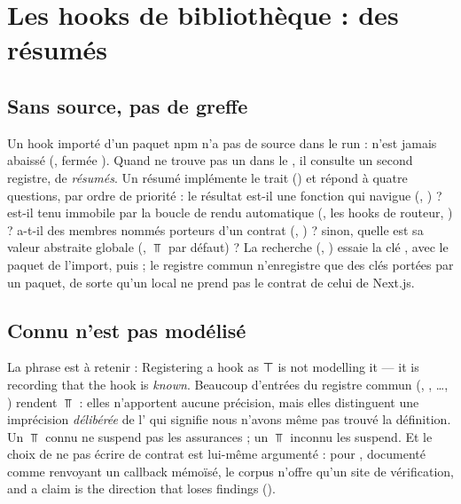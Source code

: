 \section{Les hooks de bibliothèque : des résumés}
\label{sec:splice-resumes}

\subsection{Sans source, pas de greffe}

Un hook importé d'un paquet npm n'a pas de source dans le run :  n'est jamais abaissé (, fermée ). Quand  ne trouve pas un  dans le , il consulte un second registre, de \emph{résumés}. Un résumé implémente le trait  () et répond à quatre questions, par ordre de priorité : le résultat est-il une fonction qui navigue (, ) ? est-il tenu immobile par la boucle de rendu automatique (, les hooks de routeur, ) ? a-t-il des membres nommés porteurs d'un contrat (, ) ? sinon, quelle est sa valeur abstraite globale (, $\Top$ par défaut) ? La recherche (, ) essaie la clé , avec le paquet de l'import, puis  ; le registre commun n'enregistre que des clés portées par un paquet, de sorte qu'un  local ne prend pas le contrat de celui de Next.js.

\subsection{Connu n'est pas modélisé}


La phrase est à retenir : \og Registering a hook as ⊤ is not modelling it — it is recording that the hook is \emph{known}\fg{}. Beaucoup d'entrées du registre commun (, , \ldots, ) rendent $\Top$ : elles n'apportent aucune précision, mais elles distinguent une imprécision \emph{délibérée} de l'\Info{}  qui signifie \og nous n'avons même pas trouvé la définition\fg{}. Un $\Top$ connu ne suspend pas les assurances ; un $\Top$ inconnu les suspend. Et le choix de ne pas écrire de contrat est lui-même argumenté : pour , documenté comme renvoyant un callback mémoïsé, le corpus n'offre qu'un site de vérification, \og and a claim is the direction that loses findings\fg{} ().

